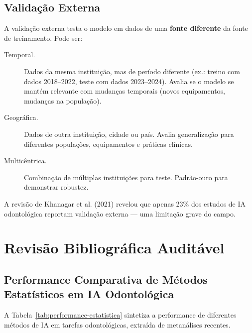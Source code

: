 \subsection{Validação Externa}

A validação externa  testa o modelo em dados de uma \textbf{fonte diferente} da fonte de treinamento. Pode ser:

\begin{description}
    \item[Temporal.] Dados da mesma instituição, mas de período diferente (ex.: treino com dados 2018--2022, teste com dados 2023--2024). Avalia se o modelo se mantém relevante com mudanças temporais (novos equipamentos, mudanças na população).
    \item[Geográfica.] Dados de outra instituição, cidade ou país. Avalia generalização para diferentes populações, equipamentos e práticas clínicas.
    \item[Multicêntrica.] Combinação de múltiplas instituições para teste. Padrão-ouro para demonstrar robustez.
\end{description}

A revisão de Khanagar et al. (2021) \cite{ODT-001} revelou que apenas 23\% dos estudos de IA odontológica reportam validação externa — uma limitação grave do campo.

\section{Revisão Bibliográfica Auditável}

\subsection{Performance Comparativa de Métodos Estatísticos em IA Odontológica}

A Tabela~\ref{tab:performance-estatistica} sintetiza a performance de diferentes métodos de IA em tarefas odontológicas, extraída de metanálises recentes.

